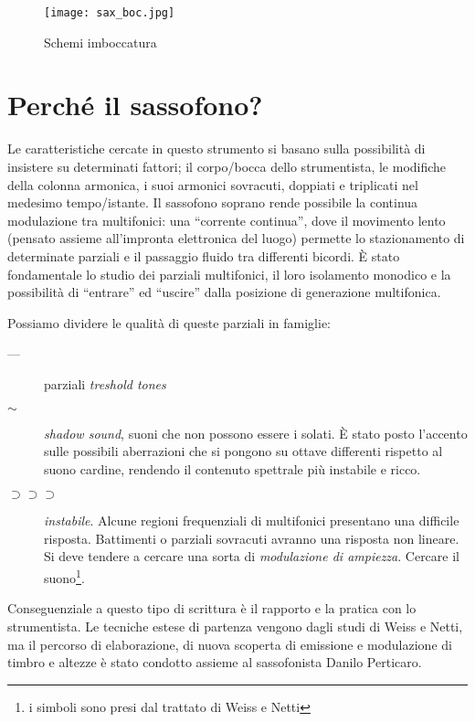 \begin{figure}[h]
\centering
{\texttt{[image: sax\_boc.jpg]}}
\caption[Schemi imboccatura]{Schemi imboccatura}
\label{fig:imboccatura}
\end{figure}

\section{Perché il sassofono?}

Le caratteristiche cercate in questo strumento si basano sulla possibilità
di insistere su determinati fattori; il corpo/bocca dello strumentista, 
le modifiche della colonna armonica, i suoi armonici sovracuti, doppiati
e triplicati nel medesimo tempo/istante.
Il sassofono soprano rende possibile la continua modulazione tra multifonici:
una “corrente continua”,  dove il movimento lento (pensato assieme all'impronta
elettronica del luogo) permette lo stazionamento di determinate parziali
e il passaggio fluido tra differenti bicordi. È stato fondamentale lo studio
dei parziali multifonici, il loro isolamento monodico e la possibilità di 
“entrare” ed “uscire” dalla posizione di generazione multifonica.

Possiamo dividere le qualità di queste parziali in famiglie:

\begin{description}
	\item[ --- ] parziali \emph{treshold tones}
	\item[ $ \sim $]  \emph{shadow sound}, suoni che non possono essere i solati.
	È stato posto l’accento sulle possibili aberrazioni che si pongono su ottave differenti
	rispetto al suono cardine, rendendo il contenuto spettrale più instabile e ricco.
	\item [ $ \supset\supset\supset $] \emph{instabile}. Alcune regioni frequenziali di multifonici presentano una
	difficile risposta. Battimenti o parziali sovracuti avranno una risposta non lineare.
	Si deve tendere a cercare una sorta di \emph{modulazione di ampiezza}.
	Cercare il suono\footnote{i simboli sono presi dal trattato di Weiss e Netti}.
\end{description}

Conseguenziale a questo tipo di scrittura è il rapporto e la pratica con lo strumentista.
Le tecniche estese di partenza vengono dagli studi di Weiss e Netti, ma il percorso di
elaborazione, di nuova scoperta di emissione e modulazione di timbro e altezze è
stato condotto assieme al sassofonista Danilo Perticaro.

